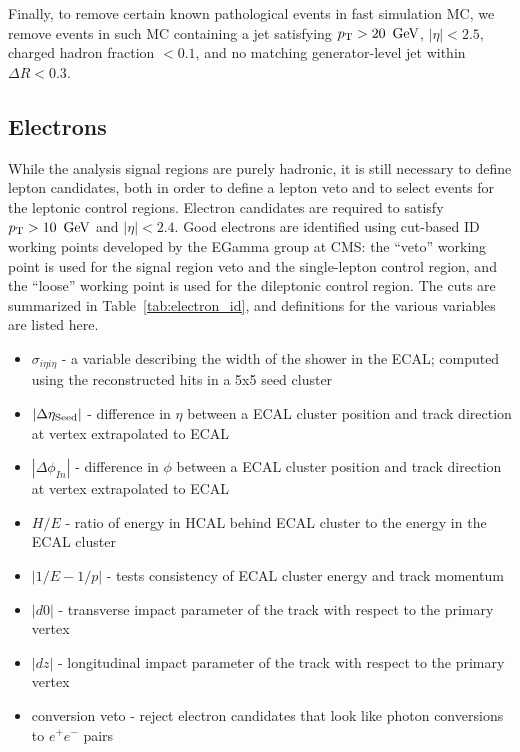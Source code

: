 Finally, to remove certain known pathological events in fast simulation MC, we remove events in such MC containing
a jet satisfying $p_{\mathrm{T}}>20~\,\text{Ge\hspace{-.08em}V}$, $|\eta|<2.5$, charged hadron fraction $<0.1$, and no matching generator-level jet
within $\Delta R<0.3$.

\subsection{Electrons}

While the analysis signal regions are purely hadronic, it is still necessary to define lepton candidates, 
both in order to define a lepton veto and to select events for the leptonic control regions.
Electron candidates are required to satisfy $p_{\mathrm{T}}>10~\,\text{Ge\hspace{-.08em}V}$ and $|\eta|<2.4$. Good electrons are identified
using cut-based ID working points developed by the EGamma group at CMS: the ``veto'' working point is used for
the signal region veto and the single-lepton control region, and the ``loose'' working point is used for
the dileptonic \zll control region. The cuts are summarized in Table~\ref{tab:electron_id}, and definitions
for the various variables are listed here.
\begin{itemize}\setlength\itemsep{-1mm}
\item $\sigma_{i\eta i\eta}$ - a variable describing the width of the shower in the ECAL; computed using the 
reconstructed hits in a 5x5 seed cluster
\item $|\Delta\eta_{\mathrm{Seed}}|$ - difference in $\eta$ between a ECAL cluster position and track direction at vertex extrapolated to ECAL
\item $|\Delta\phi_{In}|$ - difference in $\phi$ between a ECAL cluster position and track direction at vertex extrapolated to ECAL
\item $H/E$ - ratio of energy in HCAL behind ECAL cluster to the energy in the ECAL cluster
\item $|1/E-1/p|$ - tests consistency of ECAL cluster energy and track momentum
\item $|d0|$ - transverse impact parameter of the track with respect to the primary vertex
\item $|dz|$ - longitudinal impact parameter of the track with respect to the primary vertex
\item conversion veto - reject electron candidates that look like photon conversions to $e^+e^-$ pairs
\end{itemize}

